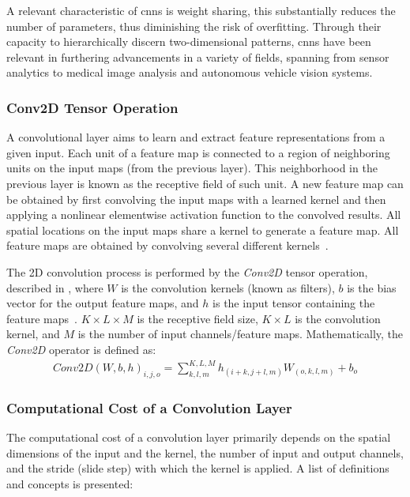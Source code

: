 A relevant characteristic of \glspl{cnn} is weight sharing, this substantially reduces the number of parameters, thus diminishing the risk of overfitting. Through their capacity to hierarchically discern two-dimensional patterns, \glspl{cnn} have been relevant in furthering advancements in a variety of fields, spanning from sensor analytics to medical image analysis and autonomous vehicle vision systems.

\subsubsection{Conv2D Tensor Operation}
A convolutional layer aims to learn and extract feature representations from a given input. Each unit of a feature map is connected to a region of neighboring units on the input maps (from the previous layer). This neighborhood in the previous layer is known as the receptive field of such unit. A new feature map can be obtained by first convolving the input maps with a learned kernel and then applying a nonlinear elementwise activation function to the convolved results. All spatial locations on the input maps share a kernel to generate a feature map. All feature maps are obtained by convolving several different kernels~\cite{gu2018recent}.


The 2D convolution process is performed by the \emph{Conv2D} tensor operation, described in , where $W$ is the convolution kernels (known as filters), $b$ is the bias vector for the output feature maps, and $h$ is the input tensor containing the feature maps~\cite{goodfellow2016deep}. $K\times L\times M$ is the receptive field size, $K\times L$ is the convolution kernel, and $M$ is the number of input channels/feature maps. Mathematically, the \emph{Conv2D} operator is defined as:
\begin{eqnarray} \label{eq:conv2D}
Conv2D\left(W,b,h\right)_{i,j,o}=\sum_{k,l,m}^{K,L,M} h_{(i+k,j+l,m)} W_{(o,k,l,m)}+b_{o}
\end{eqnarray}

\subsubsection{Computational Cost of a Convolution Layer}

The computational cost of a convolution layer primarily depends on the spatial dimensions of the input and the kernel, the number of input and output channels, and the stride (slide step) with which the kernel is applied. A list of definitions and concepts is presented:

